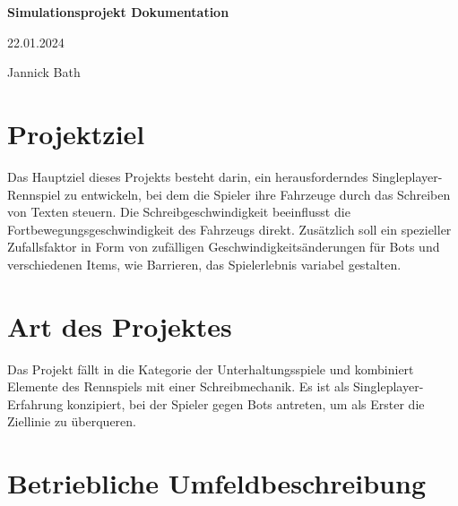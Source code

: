 \documentclass[hidelinks,12pt]{article}
\begin{document}
\begin{titlepage}
    \centering
    \vspace*{4cm} %

    \huge\bfseries Simulationsprojekt Dokumentation\par
    \vspace{1.5cm} %

    \Large 22.01.2024\par
    \vspace{1.5cm} %

    \large Jannick Bath\par
    \vspace{4cm} %

    \vfill

\end{titlepage}

\newpage

\tableofcontents %

\newpage

\section{Projektziel}
Das Hauptziel dieses Projekts besteht darin, ein herausforderndes Singleplayer-Rennspiel zu entwickeln, bei dem die Spieler ihre Fahrzeuge durch das Schreiben von Texten steuern. Die Schreibgeschwindigkeit beeinflusst die Fortbewegungsgeschwindigkeit des Fahrzeugs direkt. Zusätzlich soll ein spezieller Zufallsfaktor in Form von zufälligen Geschwindigkeitsänderungen für Bots und verschiedenen Items, wie Barrieren, das Spielerlebnis variabel gestalten.

\section{Art des Projektes}
Das Projekt fällt in die Kategorie der Unterhaltungsspiele und kombiniert Elemente des Rennspiels mit einer Schreibmechanik. Es ist als Singleplayer-Erfahrung konzipiert, bei der Spieler gegen Bots antreten, um als Erster die Ziellinie zu überqueren.

\section{Betriebliche Umfeldbeschreibung}
\end{document}
